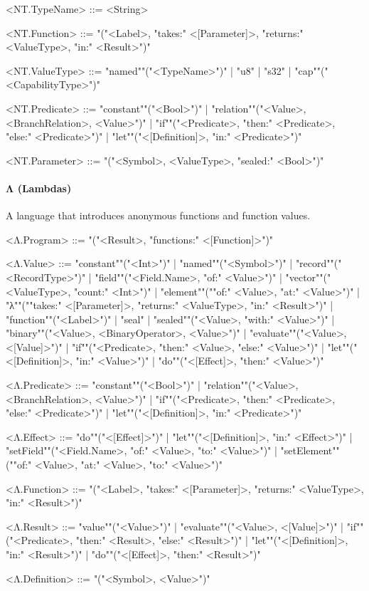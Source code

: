 \documentclass[main.tex]{subfiles}
\begin{document}
\begin{grammar}
				\par
				<NT.TypeName> ::=
						<String>
				\par
				<NT.Function> ::=
							"("<Label>, "takes:" <[Parameter]>, "returns:" <ValueType>, "in:" <Result>")"
				\par
				<NT.ValueType> ::=
						"named""("<TypeName>")"
						| "u8"
						| "s32"
						| "cap""("<CapabilityType>")"
				\par
				<NT.Predicate> ::=
						"constant""("<Bool>")"
						| "relation""("<Value>, <BranchRelation>, <Value>")"
						| "if""("<Predicate>, "then:" <Predicate>, "else:" <Predicate>")"
						| "let""("<[Definition]>, "in:" <Predicate>")"
				\par
				<NT.Parameter> ::=
							"("<Symbol>, <ValueType>, "sealed:" <Bool>")"
				\par
\end{grammar}
\par
\paragraph{ Λ (Lambdas) } A language that introduces anonymous functions and function values.
\begin{grammar}
	\footnotesize
				<Λ.Program> ::=
							"("<Result>, "functions:" <[Function]>")"
				\par
				<Λ.Value> ::=
						"constant""("<Int>")"
						| "named""("<Symbol>")"
						| "record""("<RecordType>")"
						| "field""("<Field.Name>, "of:" <Value>")"
						| "vector""("<ValueType>, "count:" <Int>")"
						| "element""(""of:" <Value>, "at:" <Value>")"
						| "λ""(""takes:" <[Parameter]>, "returns:" <ValueType>, "in:" <Result>")"
						| "function""("<Label>")"
						| "seal"
						| "sealed""("<Value>, "with:" <Value>")"
						| "binary""("<Value>, <BinaryOperator>, <Value>")"
						| "evaluate""("<Value>, <[Value]>")"
						| "if""("<Predicate>, "then:" <Value>, "else:" <Value>")"
						| "let""("<[Definition]>, "in:" <Value>")"
						| "do""("<[Effect]>, "then:" <Value>")"
				\par
				<Λ.Predicate> ::=
						"constant""("<Bool>")"
						| "relation""("<Value>, <BranchRelation>, <Value>")"
						| "if""("<Predicate>, "then:" <Predicate>, "else:" <Predicate>")"
						| "let""("<[Definition]>, "in:" <Predicate>")"
				\par
				<Λ.Effect> ::=
						"do""("<[Effect]>")"
						| "let""("<[Definition]>, "in:" <Effect>")"
						| "setField""("<Field.Name>, "of:" <Value>, "to:" <Value>")"
						| "setElement""(""of:" <Value>, "at:" <Value>, "to:" <Value>")"
				\par
				<Λ.Function> ::=
							"("<Label>, "takes:" <[Parameter]>, "returns:" <ValueType>, "in:" <Result>")"
				\par
				<Λ.Result> ::=
						"value""("<Value>")"
						| "evaluate""("<Value>, <[Value]>")"
						| "if""("<Predicate>, "then:" <Result>, "else:" <Result>")"
						| "let""("<[Definition]>, "in:" <Result>")"
						| "do""("<[Effect]>, "then:" <Result>")"
				\par
				<Λ.Definition> ::=
							"("<Symbol>, <Value>")"
				\par
\end{grammar}
\par
\end{document}
